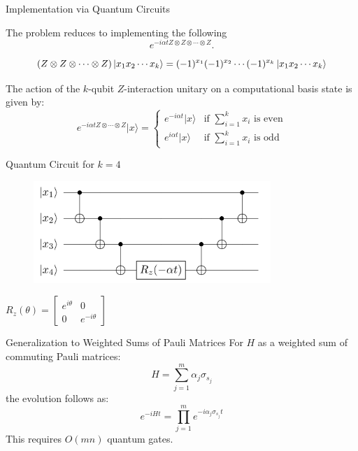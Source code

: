 \documentclass[aspectratio=169,xcolor=dvipsnames]{beamer}
\begin{document}
\begin{frame}{Implementation via Quantum Circuits}
  \begin{block}{The problem reduces to implementing the following}
  \begin{equation*}
    e^{-i \alpha t Z \otimes Z \otimes \cdots \otimes Z}.
  \end{equation*}
    \end{block}

  \begin{equation*}
    (Z \otimes Z \otimes \cdots \otimes Z) \ket{x_1 x_2 \cdots x_k} = (-1)^{x_1} (-1)^{x_2} \cdots (-1)^{x_k} \ket{x_1 x_2 \cdots x_k}
  \end{equation*}

  The action of the $k$-qubit $Z$-interaction unitary on a computational basis state is given by:
  \[
    e^{-i\alpha t Z \otimes \cdots \otimes Z} |x\rangle = 
    \begin{cases} 
      e^{-i\alpha t} |x\rangle & \text{if } \sum_{i=1}^k x_i \text{ is even} \\
      e^{i\alpha t} |x\rangle & \text{if } \sum_{i=1}^k x_i \text{ is odd}
    \end{cases}
  \]
\end{frame}

\begin{frame}{Quantum Circuit for $k=4$}
  \begin{center}
    \begin{figure}[htbp]
      \centering
      \includegraphics[width=0.8\textwidth]{rsc/circuit.png}
    \end{figure}

  \end{center}
  $R_z(\theta) = \begin{bmatrix} e^{i \theta} & 0 \\ 0 & e^{-i \theta} \end{bmatrix}$
\end{frame}

\begin{frame}{Generalization to Weighted Sums of Pauli Matrices}
  For $H$ as a weighted sum of commuting Pauli matrices:
  \begin{equation*}
    H = \sum_{j=1}^{m} \alpha_j \sigma_{s_j}
  \end{equation*}
  the evolution follows as:
  \begin{equation*}
    e^{-i H t} = \prod_{j=1}^{m} e^{-i \alpha_j \sigma_{s_j} t}
  \end{equation*}
  This requires $O(mn)$ quantum gates.
\end{frame}
\end{document}
